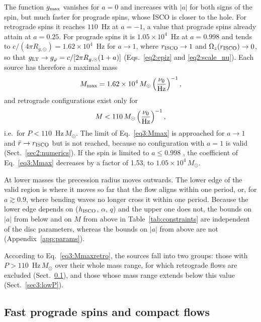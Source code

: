The function $g_\textup{max}$ vanishes for $a=0$ and increases with $|a|$ for both signs of the spin, but much faster for prograde spins, whose ISCO is closer to the hole.
For retrograde spins it reaches $110$~Hz at $a=-1$, a value that prograde spins already attain at $a=0.25$.
For prograde spins it is $1.05\times10^4$~Hz at $a=0.998$ and tends to $c/(4\pi R_{g,\odot})=1.62\times10^4$~Hz for $a\to1$, where $r_\textup{ISCO}\to1$ and $\Omega_z(r_\textup{ISCO})\to0$, so that $g_\textup{LT}\to g_\varphi=c/[2\pi R_{g,\odot}(1+a)]$ (Eqs.~\ref{eq2:epiz} and \ref{eq2:scale_nu}).
Each source has therefore a maximal mass
\begin{equation}
    \label{eq3:Mmax}
    M_\textup{max}=1.62\times10^{4}\,M_\odot\left(\frac{\nu_0}{\textup{Hz}}\right)^{-1},
\end{equation}
and retrograde configurations exist only for
\begin{equation}
    \label{eq3:Mmaxretro}
    M<110\,M_\odot\left(\frac{\nu_0}{\textup{Hz}}\right)^{-1},
\end{equation}
i.e.\ for $P<110$~Hz\,$M_\odot$.
The limit of Eq.~\eqref{eq3:Mmax} is approached for $a\to1$ and $\bar r\to r_\textup{ISCO}$ but is not reached, because no configuration with $a=1$ is valid (Sect.~\ref{sec2:numerics}).
If the spin is limited to $a\leq0.998$ \citep{Thorne1974}, the coefficient of Eq.~\eqref{eq3:Mmax} decreases by a factor of 1.53, to $1.05\times10^4\,M_\odot$.

At lower masses the precession radius moves outwards.
The lower edge of the valid region is where it moves so far that the flow aligns within one period, or, for $a\gtrsim0.9$, where bending waves no longer cross it within one period.
Because the lower edge depends on ($h_\textup{ISCO}$, $\alpha$, $q$) and the upper one does not, the bounds on $|a|$ from below and on $M$ from above in Table~\ref{tab:constraints} are independent of the disc parameters, whereas the bounds on $|a|$ from above are not (Appendix~\ref{app:params}).

According to Eq.~\eqref{eq3:Mmaxretro}, the sources fall into two groups: those with $P>110$~Hz\,$M_\odot$ over their whole mass range, for which retrograde flows are excluded (Sect.~\ref{sec3:highP}), and those whose mass range extends below this value (Sect.~\ref{sec3:lowP}).


\subsection{Fast prograde spins and compact flows}
\label{sec3:highP}

